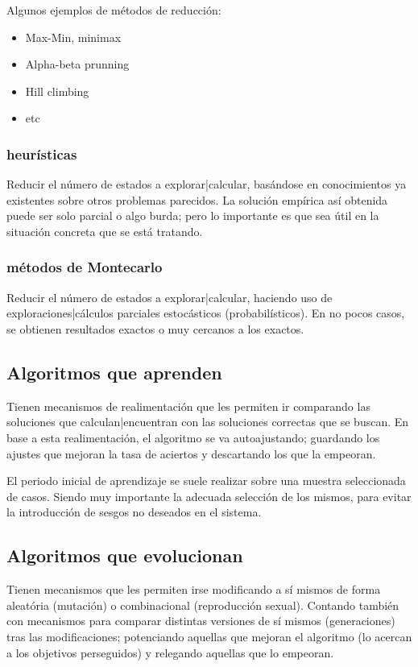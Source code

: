 \documentclass[spanish,12pt,a4paper,final,oneside]{book}
\begin{document}
Algunos ejemplos de métodos de reducción:
\begin{itemize}
\item Max-Min, minimax
\item Alpha-beta prunning
\item Hill climbing
\item etc
\end{itemize}

\subsubsection{heurísticas}
Reducir el número de estados a explorar|calcular, basándose en conocimientos ya existentes sobre otros problemas parecidos. La solución empírica así obtenida puede ser solo parcial o algo burda; pero lo importante es que sea útil en la situación concreta que se está tratando.

\subsubsection{métodos de Montecarlo}
Reducir el número de estados a explorar|calcular, haciendo uso de exploraciones|cálculos parciales estocásticos (probabilísticos). En no pocos casos, se obtienen resultados exactos o muy cercanos a los exactos.

\subsection{Algoritmos que aprenden}
Tienen mecanismos de realimentación que les permiten ir comparando las soluciones que calculan|encuentran con las soluciones correctas que se buscan. En base a esta realimentación, el algoritmo se va autoajustando; guardando los ajustes que mejoran la tasa de aciertos y descartando los que la empeoran.

El periodo inicial de aprendizaje se suele realizar sobre una muestra seleccionada de casos. Siendo muy importante la adecuada selección de los mismos, para evitar la introducción de sesgos no deseados en el sistema.

\subsection{Algoritmos que evolucionan}
Tienen mecanismos que les permiten irse modificando a sí mismos de forma aleatória (mutación) o combinacional (reproducción sexual). Contando también con mecanismos para comparar distintas versiones de sí mismos (generaciones) tras las modificaciones; potenciando aquellas que mejoran el algoritmo (lo acercan a los objetivos perseguidos) y relegando aquellas que lo empeoran.
\end{document}
